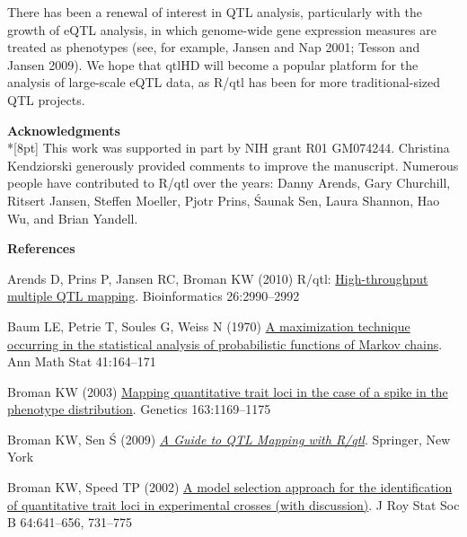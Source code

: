 \documentclass[letterpaper]{article}
\newenvironment{hanging}
{\begin{list}{}
        {\setlength{\labelwidth}{0in}
         \setlength{\leftmargin}{1em}
         \setlength{\itemindent}{-1em}
         \setlength{\parsep}{0in}
         \setlength{\itemsep}{0in}
        }
}
{\end{list}}
\begin{document}
\begin{multicols}{2}
There has been a renewal of interest in QTL analysis, particularly
with the growth of eQTL analysis, in which genome-wide gene expression
measures are treated as phenotypes (see, for example, Jansen and Nap
2001; Tesson and Jansen 2009).  We hope that qtlHD will become
a popular platform for the analysis of large-scale eQTL data, as R/qtl
has been for more traditional-sized QTL projects.

\bigskip
{}
\noindent \textbf{\sffamily Acknowledgments} \\*[8pt]
This work was supported in part by NIH grant R01 GM074244.
Christina Kendziorski generously provided comments to improve the manuscript.
Numerous
people have contributed to R/qtl over the years: Danny Arends, Gary
Churchill, Ritsert Jansen, Steffen Moeller, Pjotr Prins, \'Saunak Sen,
Laura Shannon, Hao Wu, and Brian Yandell.



\bigskip
{}
\noindent \textbf{\sffamily References}
\begin{hanging}

\item Arends D, Prins P, Jansen RC, Broman KW (2010) R/qtl:
  \href{http://www.ncbi.nlm.nih.gov/pubmed/20966004}{High-throughput
    multiple QTL mapping}. Bioinformatics 26:2990--2992

\item Baum LE, Petrie T, Soules G, Weiss N (1970)
  \href{http://projecteuclid.org/euclid.aoms/1177697196}{A
    maximization technique occurring in the statistical analysis of
    probabilistic functions of Markov chains}. Ann Math Stat
  41:164--171

\item Broman KW (2003)
  \href{http://www.ncbi.nlm.nih.gov/pubmed/12663553}{Mapping
    quantitative trait loci in the case of a spike in the phenotype
    distribution}. Genetics 163:1169--1175

\item Broman KW, Sen \'S (2009) \href{http://www.rqtl.org/book}{\emph{A
  Guide to QTL Mapping with R/qtl}}. Springer, New York

\item Broman KW, Speed TP (2002)
  \href{http://dx.doi.org/10.1111/1467-9868.00354}{A model selection
    approach for the identification of quantitative trait loci in
    experimental crosses (with discussion)}. J Roy Stat Soc B
  64:641--656, 731--775


\end{hanging}
\end{multicols}
\end{document}
